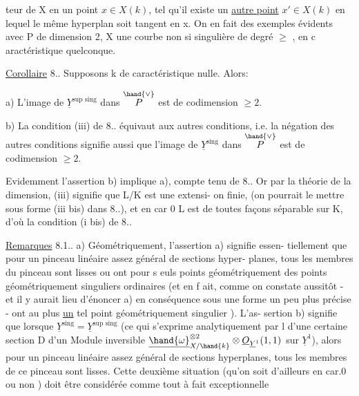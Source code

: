
teur de X en un point $x\in X(k)$,  tel qu'il existe un \uline{autre point}
$x'\in X(k)$ en lequel le même hyperplan soit tangent en x. On en fait des
exemples évidents avec  P de dimension 2, X une courbe non si
singulière de degré $\geqslant$  , en c aractéristique quelconque. 

\uline{Corollaire} 8.. Supposons k de caractéristique nulle. Alors:

a) L'image de $\underline{Y}^{\text{sup sing}}$ dans $\overset{\hand{\vee}}{P}$ est de codimension $\geqslant 2$.

b) La condition (iii) de 8.. équivaut aux autres conditions, i.e.
la négation des autres conditions\hand{,}  signifie aussi que l'image de $\underline{Y}^{\text{sing}}$
dans $\overset{\hand{\vee}}{P}$ est de codimension $\geqslant 2$.

Evidemment l'assertion b) implique a), compte tenu de 8.. Or
par la théorie de la dimension, (iii) signifie que L/K est une extensi-%
on finie,  (on pourrait le mettre sous forme (iii bis) dans 8..),
et en car 0  L est de toutes façons séparable sur K, d'où
la condition (i bis) de 8..

\uline{Remarques} 8.1.. a) Géométriquement, l'assertion a) signifie essen-%
tiellement que pour un pinceau linéaire assez général de sections hyper-%
planes, tous les membres du pinceau sont lisses ou ont 
 pour s euls points géométriquement des points géométriquement
singuliers ordinaires (et en f ait, comme on constate aussitôt - et il
y aurait lieu d'énoncer a) en conséquence sous une forme un peu plus
précise - ont au plus \uline{un} tel point géométriquement singulier ). L'as-%
sertion b) signifie  que lorsque $\underline{Y}^{\text{sing}}=\underline{Y}^{\text{sup sing}}$ (ce qui s'exprime
analytiquement par l  d'une certaine section D d'un Module
inversible $\underline{\hand{\omega}}^{\otimes 2}_{X/\hand{k}}\otimes\underline{O}_{\underline{Y}^1}(1,1)$ sur $\underline{Y}^1$), alors pour un pinceau linéaire
assez général de sections hyperplanes, tous les membres de ce 
pinceau sont lisses. Cette deuxième situation (qu'on soit d'ailleurs
en car.0 ou non ) doit être considérée comme tout à fait exceptionnelle

